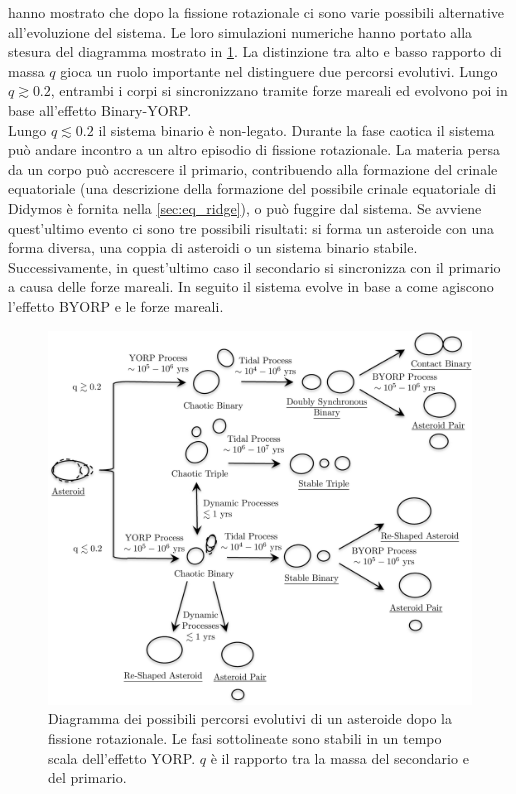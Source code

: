 \documentclass[a4paper,11pt,openright]{book}
\begin{document}
\citet{jacobson_dynamics_2011} hanno mostrato che dopo la fissione rotazionale ci sono varie possibili alternative all'evoluzione del sistema. Le loro simulazioni numeriche hanno portato alla stesura del diagramma mostrato in \cref{fig:binaries_evolution}. La distinzione tra alto e basso rapporto di massa $q$ gioca un ruolo importante nel distinguere due percorsi evolutivi. Lungo $q\gtrsim0.2$, entrambi i corpi si sincronizzano tramite forze mareali ed evolvono poi in base all'effetto Binary-YORP.\\
Lungo $q\lesssim0.2$ il sistema binario è non-legato. Durante la fase caotica il sistema può andare incontro a un altro episodio di fissione rotazionale. La materia persa da un corpo può accrescere il primario, contribuendo alla formazione del crinale equatoriale (una descrizione della formazione del possibile crinale equatoriale di Didymos è fornita nella \cref{sec:eq_ridge}), o può fuggire dal sistema. Se avviene quest'ultimo evento ci sono tre possibili risultati: si forma un asteroide con una forma diversa, una coppia di asteroidi o un sistema binario stabile. Successivamente, in quest'ultimo caso il secondario si sincronizza con il primario a causa delle forze mareali. In seguito il sistema evolve in base a come agiscono l'effetto BYORP e le forze mareali.

\begin{figure}[!h]
    \centering
    \includegraphics[scale=0.65]{figure/binaries_evolution.jpg}
    \caption[Diagramma dei possibili percorsi evolutivi di un piccolo asteroide.]{Diagramma dei possibili percorsi evolutivi di un asteroide dopo la fissione rotazionale. Le fasi sottolineate sono stabili in un tempo scala dell'effetto YORP. $q$ è il rapporto tra la massa del secondario e del primario. \citep{jacobson_dynamics_2011}}
    \label{fig:binaries_evolution}
\end{figure}
\end{document}
